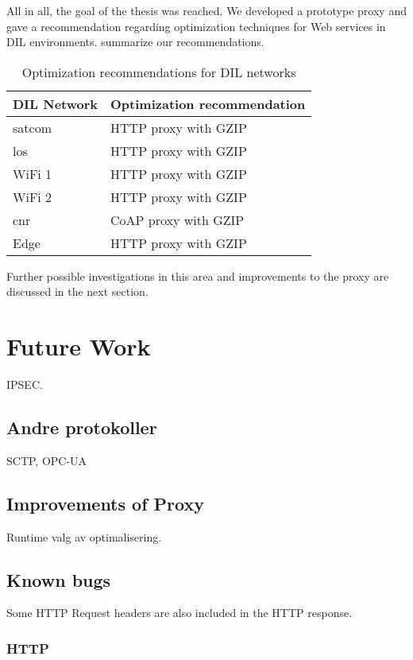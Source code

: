 All in all, the goal of the thesis was reached. We developed a prototype proxy
and gave a recommendation regarding optimization techniques for Web services in
DIL environments.  summarize our
recommendations.

\begin{table}[h]
\begin{tabularx}{\textwidth}{| l | X |}
    \hline
  \textbf{DIL Network} & \textbf{Optimization recommendation} \\ \hline
  \gls{satcom} & HTTP proxy with GZIP \\ \hline
  \gls{los} & HTTP proxy with GZIP  \\ \hline
  WiFi 1 & HTTP proxy with GZIP  \\ \hline
  WiFi 2 & HTTP proxy with GZIP  \\ \hline
  \gls{cnr} & CoAP proxy with GZIP  \\ \hline
  Edge & HTTP proxy with GZIP \\ \hline
\end{tabularx}
\caption{Optimization recommendations for DIL networks}
\label{table:conclusion-recommendations}
\end{table}

Further possible investigations in this area and improvements
to the proxy are discussed in the next section.


\section{Future Work}
IPSEC.

\subsection{Andre protokoller}
SCTP, OPC-UA

\subsection{Improvements of Proxy}

Runtime valg av optimalisering.




\subsection{Known bugs}

Some HTTP Request headers are also included in the HTTP response.

\subsubsection{HTTP}
